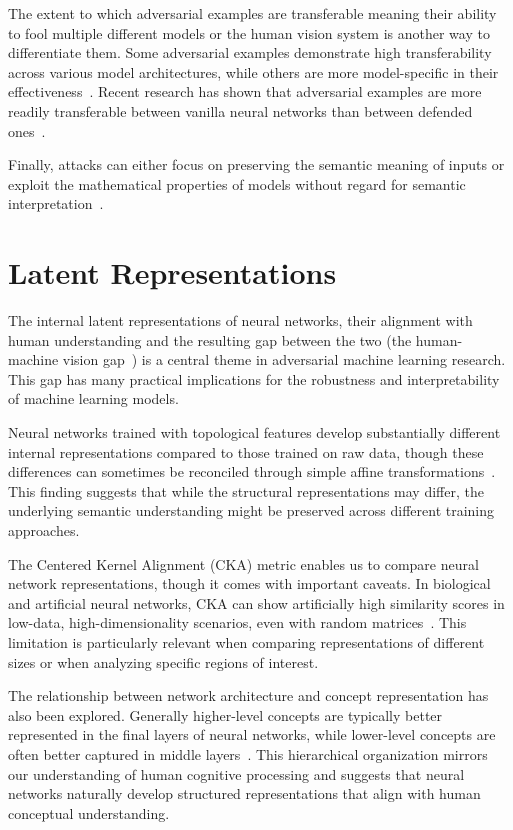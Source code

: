 \documentclass[a4paper, oneside]{discothesis}
\begin{document}
The extent to which adversarial examples are transferable \textendash{} meaning their ability to fool multiple different models or the human vision system\cite{elsayed2018adversarial} \textendash{} is another way to differentiate them. Some adversarial examples demonstrate high transferability across various model architectures, while others are more model-specific in their effectiveness~\cite{Li2022ASO, li2022review}. Recent research has shown that adversarial examples are more readily transferable between vanilla neural networks than between defended ones~\cite{li2019nattack, zheng2023black}.

Finally, attacks can either focus on preserving the semantic meaning of inputs or exploit the mathematical properties of models without regard for semantic interpretation~\cite{browne2020semantics}.

\section{Latent Representations}

The internal latent representations of neural networks, their alignment with human understanding and the resulting gap between the two (the human-machine vision gap~\cite{geirhos2021partial}) is a central theme in adversarial machine learning research. This gap has many practical implications for the robustness and interpretability of machine learning models.

Neural networks trained with topological features develop substantially different internal representations compared to those trained on raw data, though these differences can sometimes be reconciled through simple affine transformations~\cite{mcguire2023neural}. This finding suggests that while the structural representations may differ, the underlying semantic understanding might be preserved across different training approaches.

The Centered Kernel Alignment (CKA) metric enables us to compare neural network representations, though it comes with important caveats. In biological and artificial neural networks, CKA can show artificially high similarity scores in low-data, high-dimensionality scenarios, even with random matrices~\cite{murphy2024correcting}. This limitation is particularly relevant when comparing representations of different sizes or when analyzing specific regions of interest.

The relationship between network architecture and concept representation has also been explored. Generally higher-level concepts are typically better represented in the final layers of neural networks, while lower-level concepts are often better captured in middle layers~\cite{Agafonov2022AnEO, Agafonov2022LocalizationOO}. This hierarchical organization mirrors our understanding of human cognitive processing and suggests that neural networks naturally develop structured representations that align with human conceptual understanding.
\end{document}
